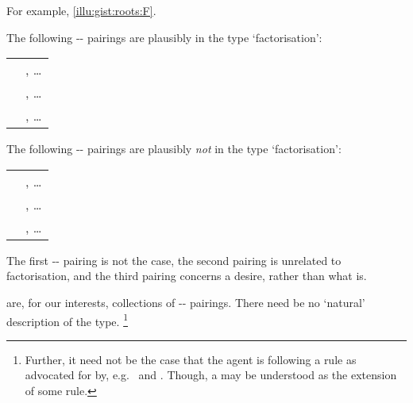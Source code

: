 \begin{note}
  For example, \autoref{illu:gist:roots:F}.

  The following -\val{}-\pool{} pairings are plausibly in the type `factorisation':
  \begin{center}
    \begin{tabular}{R{.45\textwidth} L{.45\textwidth}}
       & , \dots \\
       & , \dots \\
       & , \dots \\
    \end{tabular}
  \end{center}
  The following -\val{}-\pool{} pairings are plausibly \emph{not} in the type `factorisation':

  \begin{center}
    \begin{tabular}{R{.45\textwidth} L{.45\textwidth}}
       & , \dots \\
       & , \dots \\
       & , \dots \\
    \end{tabular}
  \end{center}

  The first -- pairing is not the case, the second pairing is unrelated to factorisation, and the third pairing concerns a desire, rather than what is.
\end{note}


\begin{note}
   are, for our interests, collections of -- pairings.
  There need be no `natural' description of the type.%
  \footnote{
    Further, it need not be the case that the agent is following a rule as advocated for by, e.g.\ \textcite{Boghossian:2008vf} and \textcite{Broome:2013aa}.
    Though, a \torNa{} may be understood as the extension of some rule.
  }
\end{note}



